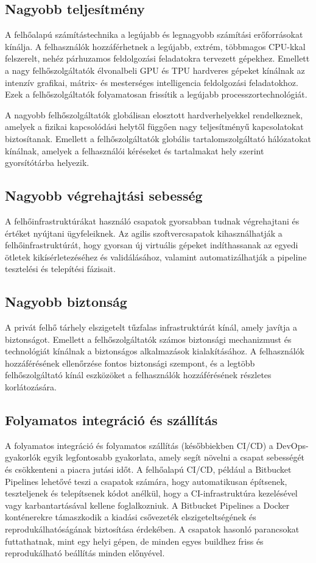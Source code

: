 \subsection*{Nagyobb teljesítmény}
A felhőalapú számítástechnika a legújabb és legnagyobb számítási erőforrásokat kínálja. A felhasználók hozzáférhetnek a legújabb, extrém, többmagos CPU-kkal felszerelt, nehéz párhuzamos feldolgozási feladatokra tervezett gépekhez. Emellett a nagy felhőszolgáltatók élvonalbeli GPU és TPU hardveres gépeket kínálnak az intenzív grafikai, mátrix- és mesterséges intelligencia feldolgozási feladatokhoz. Ezek a felhőszolgáltatók folyamatosan frissítik a legújabb processzortechnológiát.

A nagyobb felhőszolgáltatók globálisan elosztott hardverhelyekkel rendelkeznek, amelyek a fizikai kapcsolódási helytől függően nagy teljesítményű kapcsolatokat biztosítanak. Emellett a felhőszolgáltatók globális tartalomszolgáltató hálózatokat kínálnak, amelyek a felhasználói kéréseket és tartalmakat hely szerint gyorsítótárba helyezik.
\cite{cloudComp}

\subsection*{Nagyobb végrehajtási sebesség}
A felhőinfrastruktúrákat használó csapatok gyorsabban tudnak végrehajtani és értéket nyújtani ügyfeleiknek. Az agilis szoftvercsapatok kihasználhatják a felhőinfrastruktúrát, hogy gyorsan új virtuális gépeket indíthassanak az egyedi ötletek kikísérletezéséhez és validálásához, valamint automatizálhatják a pipeline tesztelési és telepítési fázisait.
\cite{cloudComp}

\subsection*{Nagyobb biztonság}
A privát felhő tárhely elszigetelt tűzfalas infrastruktúrát kínál, amely javítja a biztonságot. Emellett a felhőszolgáltatók számos biztonsági mechanizmust és technológiát kínálnak a biztonságos alkalmazások kialakításához. A felhasználók hozzáférésének ellenőrzése fontos biztonsági szempont, és a legtöbb felhőszolgáltató kínál eszközöket a felhasználók hozzáférésének részletes korlátozására.
\cite{cloudComp}

\subsection*{Folyamatos integráció és szállítás}
A folyamatos integráció és folyamatos szállítás (későbbiekben CI/CD) a DevOps-gyakorlók egyik legfontosabb gyakorlata, amely segít növelni a csapat sebességét és csökkenteni a piacra jutási időt. A felhőalapú CI/CD, például a Bitbucket Pipelines lehetővé teszi a csapatok számára, hogy automatikusan építsenek, teszteljenek és telepítsenek kódot anélkül, hogy a CI-infrastruktúra kezelésével vagy karbantartásával kellene foglalkozniuk. A Bitbucket Pipelines a Docker konténerekre támaszkodik a kiadási csővezeték elszigeteltségének és reprodukálhatóságának biztosítása érdekében. A csapatok hasonló parancsokat futtathatnak, mint egy helyi gépen, de minden egyes buildhez friss és reprodukálható beállítás minden előnyével.
\cite{cloudComp}

